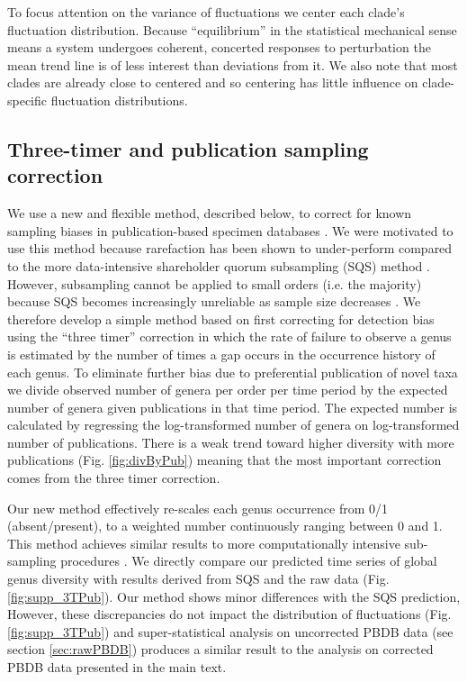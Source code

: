 \documentclass[12pt]{article}
\let\citep=\cite
\begin{document}
To focus attention on the variance of fluctuations we center each
clade's fluctuation distribution. Because ``equilibrium'' in the
statistical mechanical sense means a system undergoes coherent,
concerted responses to perturbation the mean trend line is of less
interest than deviations from it. We also note that most clades are
already close to centered and so centering has little influence on
clade-specific fluctuation distributions.

\subsection*{Three-timer and publication sampling correction} 
\label{sec:3TP}
We use a new and flexible method, described below, to correct for
known sampling biases in publication-based specimen databases
\citep{alroy08, alroy2010}.  We were motivated to use this method
because rarefaction has been shown to under-perform compared to the
more data-intensive shareholder quorum subsampling (SQS) method
\citep{alroy2010}.  However, subsampling cannot be applied to small
orders (i.e. the majority) because SQS becomes increasingly unreliable
as sample size decreases \citep{alroy2010}.  We therefore develop a
simple method based on first correcting for detection bias using the
``three timer'' correction \citep{alroy08} in which the rate of failure
to observe a genus is estimated by the number of times a gap occurs in
the occurrence history of each genus. To eliminate further bias due to
preferential publication of novel taxa we divide observed number of
genera per order per time period by the expected number of genera
given publications in that time period.  The expected number is
calculated by regressing the log-transformed number of genera on
log-transformed number of publications. There is a weak trend toward
higher diversity with more publications (Fig. \ref{fig:divByPub})
meaning that the most important correction comes from the three timer
correction.

Our new method effectively re-scales each genus occurrence from 0/1
(absent/present), to a weighted number continuously ranging between 0
and 1.  This method achieves similar results to more computationally
intensive sub-sampling procedures \citep{alroy08, alroy2010}. We
directly compare our predicted time series of global genus diversity
with results derived from SQS \citep{alroy2010} and the raw data
(Fig. \ref{fig:supp_3TPub}).  Our method shows minor differences with
the SQS prediction, However, these discrepancies do not impact the
distribution of fluctuations (Fig. \ref{fig:supp_3TPub}) and
super-statistical analysis on uncorrected PBDB data (see section
\ref{sec:rawPBDB}) produces a similar result to the analysis on
corrected PBDB data presented in the main text.
\end{document}
